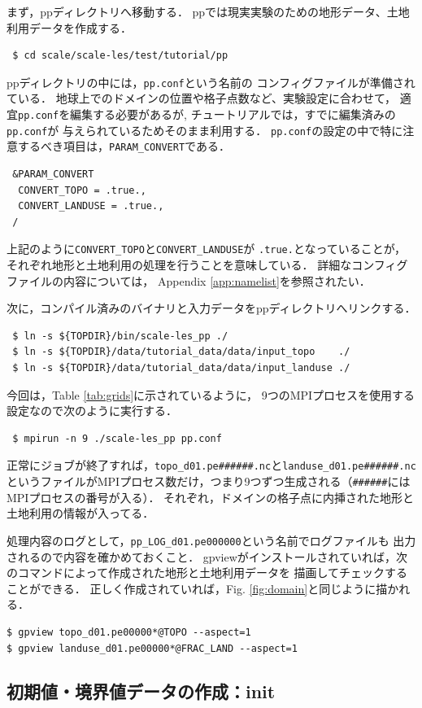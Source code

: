 まず，ppディレクトリへ移動する．
ppでは現実実験のための地形データ、土地利用データを作成する．
\begin{verbatim}
 $ cd scale/scale-les/test/tutorial/pp
\end{verbatim}
ppディレクトリの中には，\verb|pp.conf|という名前の
コンフィグファイルが準備されている．
地球上でのドメインの位置や格子点数など、実験設定に合わせて，
適宜\verb|pp.conf|を編集する必要があるが,
チュートリアルでは，すでに編集済みの\verb|pp.conf|が
与えられているためそのまま利用する．
\verb|pp.conf|の設定の中で特に注意するべき項目は，\verb|PARAM_CONVERT|である．
\begin{verbatim}
 &PARAM_CONVERT
  CONVERT_TOPO = .true.,
  CONVERT_LANDUSE = .true.,
 /
\end{verbatim}
上記のように\verb|CONVERT_TOPO|と\verb|CONVERT_LANDUSE|が
\verb|.true.|となっていることが，
それぞれ地形と土地利用の処理を行うことを意味している．
詳細なコンフィグファイルの内容については，
Appendix \ref{app:namelist}を参照されたい．

次に，コンパイル済みのバイナリと入力データをppディレクトリへリンクする．
\begin{verbatim}
 $ ln -s ${TOPDIR}/bin/scale-les_pp ./
 $ ln -s ${TOPDIR}/data/tutorial_data/data/input_topo    ./
 $ ln -s ${TOPDIR}/data/tutorial_data/data/input_landuse ./
\end{verbatim}
今回は，Table \ref{tab:grids}に示されているように，
9つのMPIプロセスを使用する設定なので次のように実行する．
\begin{verbatim}
 $ mpirun -n 9 ./scale-les_pp pp.conf
\end{verbatim}
正常にジョブが終了すれば，\verb|topo_d01.pe######.nc|と\verb|landuse_d01.pe######.nc|というファイルがMPIプロセス数だけ，つまり9つずつ生成される（\verb|######|にはMPIプロセスの番号が入る）．
それぞれ，ドメインの格子点に内挿された地形と土地利用の情報が入ってる．

処理内容のログとして，\verb|pp_LOG_d01.pe000000|という名前でログファイルも
出力されるので内容を確かめておくこと．
gpviewがインストールされていれば，次のコマンドによって作成された地形と土地利用データを
描画してチェックすることができる．
正しく作成されていれば，Fig. \ref{fig:domain}と同じように描かれる．
\begin{verbatim}
$ gpview topo_d01.pe00000*@TOPO --aspect=1
$ gpview landuse_d01.pe00000*@FRAC_LAND --aspect=1
\end{verbatim}


\subsection{初期値・境界値データの作成：init}

